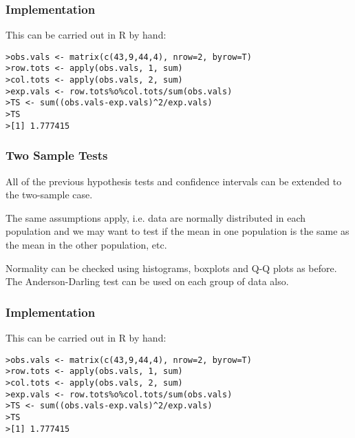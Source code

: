 \subsubsection{Implementation}

This can be carried out in R by hand:

\footnotesize \begin{verbatim}
>obs.vals <- matrix(c(43,9,44,4), nrow=2, byrow=T)
>row.tots <- apply(obs.vals, 1, sum)
>col.tots <- apply(obs.vals, 2, sum)
>exp.vals <- row.tots%o%col.tots/sum(obs.vals)
>TS <- sum((obs.vals-exp.vals)^2/exp.vals)
>TS
>[1] 1.777415
\end{verbatim}\normalsize





\subsubsection{Two Sample Tests}


All of the previous hypothesis tests and confidence intervals can be
extended to the two-sample case.

The same assumptions apply, i.e. data are normally distributed in
each population and we may want to test if the mean in one
population is the same as the mean in the other population, etc.

Normality can be checked using histograms, boxplots and Q-Q
plots as before. The Anderson-Darling test can be used on
each group of data also.


\subsubsection{Implementation}

This can be carried out in R by hand:

\footnotesize \begin{verbatim}
>obs.vals <- matrix(c(43,9,44,4), nrow=2, byrow=T)
>row.tots <- apply(obs.vals, 1, sum)
>col.tots <- apply(obs.vals, 2, sum)
>exp.vals <- row.tots%o%col.tots/sum(obs.vals)
>TS <- sum((obs.vals-exp.vals)^2/exp.vals)
>TS
>[1] 1.777415
\end{verbatim}\normalsize

